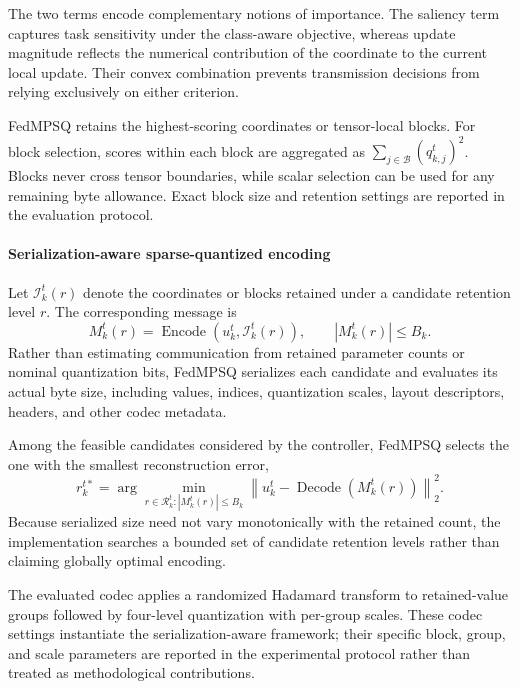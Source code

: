 \documentclass[conference,a4paper]{IEEEtran}
\begin{document}
The two terms encode complementary notions of importance. The saliency term
captures task sensitivity under the class-aware objective, whereas update
magnitude reflects the numerical contribution of the coordinate to the
current local update. Their convex combination prevents transmission decisions
from relying exclusively on either criterion.

FedMPSQ retains the highest-scoring coordinates or tensor-local blocks. For
block selection, scores within each block are aggregated as
$\sum_{j\in\mathcal{B}}(q_{k,j}^t)^2$. Blocks never cross tensor boundaries,
while scalar selection can be used for any remaining byte allowance. Exact
block size and retention settings are reported in the evaluation protocol.

\paragraph{Serialization-aware sparse-quantized encoding}
Let $\mathcal{I}_k^t(r)$ denote the coordinates or blocks retained under a
candidate retention level $r$. The corresponding message is
\begin{equation}
M_k^t(r)
=
\operatorname{Encode}
\left(
u_k^t,\mathcal{I}_k^t(r)
\right),
\qquad
|M_k^t(r)|\leq B_k .
\label{eq:msg}
\end{equation}
Rather than estimating communication from retained parameter counts or
nominal quantization bits, FedMPSQ serializes each candidate and evaluates its
actual byte size, including values, indices, quantization scales, layout
descriptors, headers, and other codec metadata.

Among the feasible candidates considered by the controller, FedMPSQ selects
the one with the smallest reconstruction error,
\begin{equation}
r_k^{t*}
=
\arg\min_{r\in\mathcal{R}_k^t:
|M_k^t(r)|\leq B_k}
\left\|
u_k^t-
\operatorname{Decode}(M_k^t(r))
\right\|_2^2 .
\label{eq:byte_controller}
\end{equation}
Because serialized size need not vary monotonically with the retained count,
the implementation searches a bounded set of candidate retention levels rather
than claiming globally optimal encoding.

The evaluated codec applies a randomized Hadamard transform to retained-value
groups followed by four-level quantization with per-group scales. These codec
settings instantiate the serialization-aware framework; their specific block,
group, and scale parameters are reported in the experimental protocol rather
than treated as methodological contributions.
\end{document}
